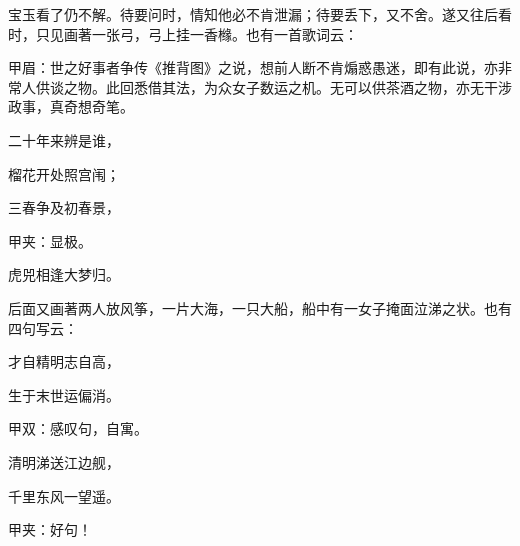 \begin{parag}
    宝玉看了仍不解。待要问时，情知他必不肯泄漏；待要丢下，又不舍。遂又往后看时，只见画著一张弓，弓上挂一香橼。也有一首歌词云：\begin{note}甲眉：世之好事者争传《推背图》之说，想前人断不肯煽惑愚迷，即有此说，亦非常人供谈之物。此回悉借其法，为众女子数运之机。无可以供茶酒之物，亦无干涉政事，真奇想奇笔。\end{note}
\end{parag}


\begin{poem}
    \begin{pl}二十年来辨是谁，\end{pl}

    \begin{pl}榴花开处照宫闱；\end{pl}

    \begin{pl}三春争及初春景，\end{pl}\begin{note}甲夹：显极。\end{note}

    \begin{pl}虎兕相逢大梦归。\end{pl}
\end{poem}


\begin{parag}
    后面又画著两人放风筝，一片大海，一只大船，船中有一女子掩面泣涕之状。也有四句写云：
\end{parag}


\begin{poem}
    \begin{pl}才自精明志自高，\end{pl}

    \begin{pl}生于末世运偏消。\end{pl}\begin{note}甲双：感叹句，自寓。\end{note}

    \begin{pl}清明涕送江边舰，\end{pl}

    \begin{pl}千里东风一望遥。\end{pl}\begin{note}甲夹：好句！\end{note}
\end{poem}


